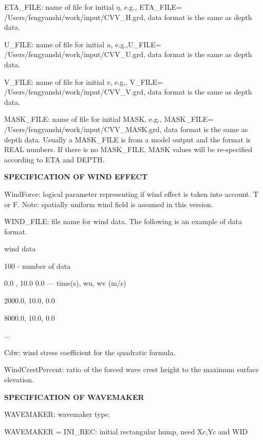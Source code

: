 \documentclass[11pt]{article}
\begin{document}
\begin{description}
 
\item ETA\_FILE: name of file for initial $\eta $, e.g., ETA\_FILE= /Users/fengyanshi/work/input/CVV\_H.grd, data format is the same as depth data.

\item U\_FILE:  name of file for initial $u$, e.g.,U\_FILE= /Users/fengyanshi/work/input/CVV\_U.grd, data format is the same as depth data.

\item V\_FILE:  name of file for initial $v$, e.g., V\_FILE= /Users/fengyanshi/work/input/CVV\_V.grd, data format is the same as depth data.

\item MASK\_FILE:  name of file for initial MASK, e.g., MASK\_FILE= /Users/fengyanshi/work/input/CVV\_MASK.grd, data format is the same as depth data. Usually a MASK\_FILE is from a model output and the format is REAL numbers. If there is no MASK\_FILE, MASK values will be re-specified according to ETA and DEPTH.  

 \item {\bf SPECIFICATION OF WIND EFFECT}
 
 \item WindForce: logical parameter representing if wind effect is taken into account. T or F. Note: spatially uniform wind field is assumed in this version.   

\item WIND\_FILE: file name for wind data. The following is an example of data format.

wind data

100  - number of data

0.0 ,    10.0 0.0   ---  time(s), wu, wv (m/s)

2000.0,   10.0,  0.0

8000.0,  10.0,   0.0
 
... 


\item Cdw: wind stress coefficient for the quadratic formula. 

\item WindCrestPercent: ratio of the forced wave crest height to the maximum surface elevation. 

 \item {\bf SPECIFICATION OF WAVEMAKER}

\item WAVEMAKER: wavemaker type. 

WAVEMAKER = INI\_REC: initial rectangular hump, need  Xc,Yc and WID


\end{description}
\end{document}

